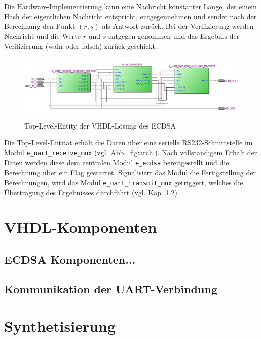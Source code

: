 Die Hardware-Implementierung kann eine Nachricht konstanter Länge, der einem Hash der eigentlichen Nachricht entspricht, entgegennehmen und sendet nach der Berechnung den Punkt $(r,s)$ als Antwort zurück. Bei der Verifizierung werden Nachricht und die Werte $r$ und $s$ entgegen genommen und das Ergebnis der Verifizierung (wahr oder falsch) zurück geschickt. \\

\begin{figure}[thb]
	\centering
  	\includegraphics[width=\textwidth]{bilder/tle}
	\caption{Top-Level-Entity der VHDL-Lösung des ECDSA}
	\label{fig:tle}
\end{figure}

Die Top-Level-Entität erhält die Daten über eine serielle RS232-Schnittstelle im Modul \texttt{e\_uart\_receive\_mux} (vgl. Abb. \ref{fig:arch}). Nach vollständigem Erhalt der Daten werden diese dem zentralen Modul \texttt{e\_ecdsa} bereitgestellt und die Berechnung über ein Flag gestartet. Signalisiert das Modul die Fertigstellung der Berechnungen, wird das Modul \texttt{e\_uart\_transmit\_mux} getriggert, welches die Übertragung des Ergebnisses durchführt (vgl. Kap. \ref{sec:uart}). \\


\section{VHDL-Komponenten}

\subsection{ECDSA Komponenten...}


\subsection{Kommunikation der UART-Verbindung} \label{sec:uart}



\section{Synthetisierung}




